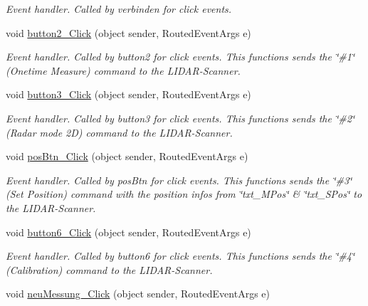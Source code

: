 \begin{DoxyCompactItemize}
\begin{DoxyCompactList}\small\item\em Event handler. Called by verbinden for click events. \end{DoxyCompactList}\item 
void \hyperlink{class_l_i_d_a_r___controller_1_1_main_window_a0be51e6fbf9c79cc4bbd40f41f044c47}{button2\+\_\+\+Click} (object sender, Routed\+Event\+Args e)
\begin{DoxyCompactList}\small\item\em Event handler. Called by button2 for click events. This functions sends the \char`\"{}\#1\char`\"{} (Onetime Measure) command to the L\+I\+D\+A\+R-\/\+Scanner. \end{DoxyCompactList}\item 
void \hyperlink{class_l_i_d_a_r___controller_1_1_main_window_a889652277fc1bd0a5f3e1aa584d30a20}{button3\+\_\+\+Click} (object sender, Routed\+Event\+Args e)
\begin{DoxyCompactList}\small\item\em Event handler. Called by button3 for click events. This functions sends the \char`\"{}\#2\char`\"{} (Radar mode 2D) command to the L\+I\+D\+A\+R-\/\+Scanner. \end{DoxyCompactList}\item 
void \hyperlink{class_l_i_d_a_r___controller_1_1_main_window_ac59530029320b9182c0db19ec2bb1344}{pos\+Btn\+\_\+\+Click} (object sender, Routed\+Event\+Args e)
\begin{DoxyCompactList}\small\item\em Event handler. Called by pos\+Btn for click events. This functions sends the \char`\"{}\#3\char`\"{} (Set Position) command with the position infos from \char`\"{}txt\+\_\+\+M\+Pos\char`\"{} \& \char`\"{}txt\+\_\+\+S\+Pos\char`\"{} to the L\+I\+D\+A\+R-\/\+Scanner. \end{DoxyCompactList}\item 
void \hyperlink{class_l_i_d_a_r___controller_1_1_main_window_a7819bd652f8bd6630e5879a7b101ec51}{button6\+\_\+\+Click} (object sender, Routed\+Event\+Args e)
\begin{DoxyCompactList}\small\item\em Event handler. Called by button6 for click events. This functions sends the \char`\"{}\#4\char`\"{} (Calibration) command to the L\+I\+D\+A\+R-\/\+Scanner. \end{DoxyCompactList}\item 
void \hyperlink{class_l_i_d_a_r___controller_1_1_main_window_ab831283d55f1beb21fcf043db6690c11}{neu\+Messung\+\_\+\+Click} (object sender, Routed\+Event\+Args e)

\end{DoxyCompactItemize}
